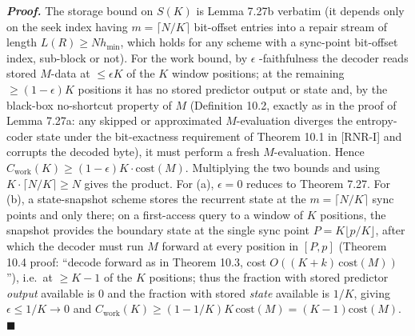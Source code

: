\documentclass[
]{article}
\begin{document}
\emph{\textbf{Proof.}} The storage bound on $S(K)$ is Lemma 7.27b
verbatim (it depends only on the seek index having $m = \lceil N/K
\rceil$ bit-offset entries into a repair stream of length $L(R) \geq N
h_{\min}$, which holds for any scheme with a sync-point bit-offset
index, sub-block or not). For the work bound, by $\epsilon$
-faithfulness the decoder reads stored $M$-data at $\leq \epsilon K$ of
the $K$ window positions; at the remaining $\geq (1-\epsilon)K$
positions it has no stored predictor output or state and, by the
black-box no-shortcut property of $M$ (Definition 10.2, exactly as in
the proof of Lemma 7.27a: any skipped or approximated $M$-evaluation
diverges the entropy-coder state under the bit-exactness requirement
of Theorem 10.1 in [RNR-I] and
corrupts the decoded byte), it must perform a fresh $M$-evaluation.
Hence $C_{\mathrm{work}}(K) \geq (1-\epsilon) K \cdot \mathrm{cost}(M)$.
Multiplying the two bounds and using $K \cdot \lceil N/K \rceil \geq N$
gives the product. For (a), $\epsilon = 0$ reduces to Theorem 7.27. For
(b), a state-snapshot scheme stores the recurrent state at the $m =
\lceil N/K \rceil$ sync points and only there; on a first-access query
to a window of $K$ positions, the snapshot provides the boundary state
at the single sync point $P = K\lfloor p/K\rfloor$, after which the
decoder must run $M$ forward at every position in $[P, p]$ (Theorem
10.4 proof: ``decode forward as in Theorem 10.3, cost $O((K+k)\,
\mathrm{cost}(M))$''), i.e.\ at $\geq K - 1$ of the $K$ positions; thus
the fraction with stored predictor \emph{output} available is $0$ and
the fraction with stored \emph{state} available is $1/K$, giving
$\epsilon \leq 1/K \to 0$ and $C_{\mathrm{work}}(K) \geq (1 - 1/K) K\,
\mathrm{cost}(M) = (K-1)\mathrm{cost}(M)$. \hfill$\blacksquare$
\end{document}
